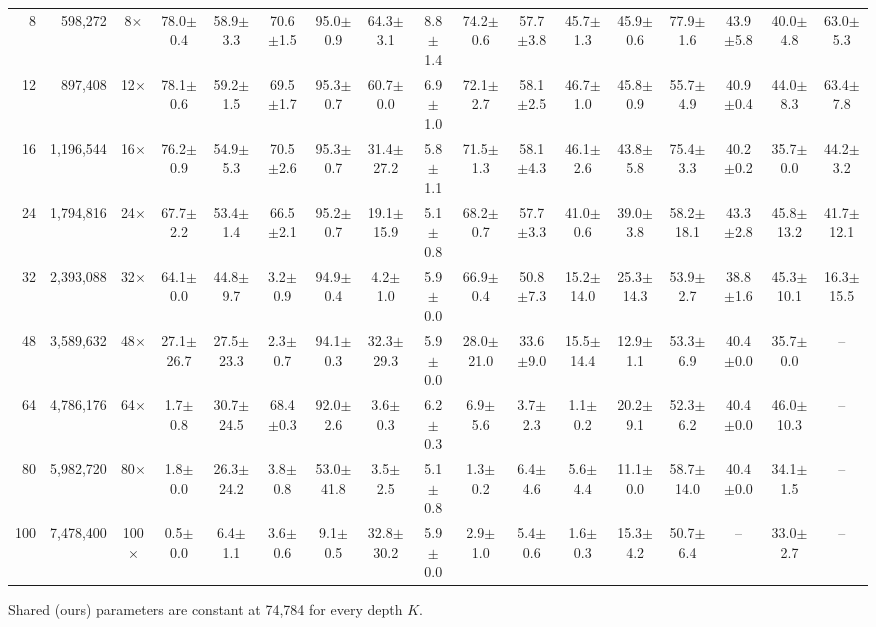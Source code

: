 \begin{table}[p]
{\begin{tabular}{rrccccccccccccccc}
8 & 598,272 & 8$\times$ & 78.0$\pm$0.4 & 58.9$\pm$3.3 & 70.6$\pm$1.5 & 95.0$\pm$0.9 & 64.3$\pm$3.1 & 8.8$\pm$1.4 & 74.2$\pm$0.6 & 57.7$\pm$3.8 & 45.7$\pm$1.3 & 45.9$\pm$0.6 & 77.9$\pm$1.6 & 43.9$\pm$5.8 & 40.0$\pm$4.8 & 63.0$\pm$5.3 \\
12 & 897,408 & 12$\times$ & 78.1$\pm$0.6 & 59.2$\pm$1.5 & 69.5$\pm$1.7 & 95.3$\pm$0.7 & 60.7$\pm$0.0 & 6.9$\pm$1.0 & 72.1$\pm$2.7 & 58.1$\pm$2.5 & 46.7$\pm$1.0 & 45.8$\pm$0.9 & 55.7$\pm$4.9 & 40.9$\pm$0.4 & 44.0$\pm$8.3 & 63.4$\pm$7.8 \\
16 & 1,196,544 & 16$\times$ & 76.2$\pm$0.9 & 54.9$\pm$5.3 & 70.5$\pm$2.6 & 95.3$\pm$0.7 & 31.4$\pm$27.2 & 5.8$\pm$1.1 & 71.5$\pm$1.3 & 58.1$\pm$4.3 & 46.1$\pm$2.6 & 43.8$\pm$5.8 & 75.4$\pm$3.3 & 40.2$\pm$0.2 & 35.7$\pm$0.0 & 44.2$\pm$3.2 \\
24 & 1,794,816 & 24$\times$ & 67.7$\pm$2.2 & 53.4$\pm$1.4 & 66.5$\pm$2.1 & 95.2$\pm$0.7 & 19.1$\pm$15.9 & 5.1$\pm$0.8 & 68.2$\pm$0.7 & 57.7$\pm$3.3 & 41.0$\pm$0.6 & 39.0$\pm$3.8 & 58.2$\pm$18.1 & 43.3$\pm$2.8 & 45.8$\pm$13.2 & 41.7$\pm$12.1 \\
32 & 2,393,088 & 32$\times$ & 64.1$\pm$0.0 & 44.8$\pm$9.7 & 3.2$\pm$0.9 & 94.9$\pm$0.4 & 4.2$\pm$1.0 & 5.9$\pm$0.0 & 66.9$\pm$0.4 & 50.8$\pm$7.3 & 15.2$\pm$14.0 & 25.3$\pm$14.3 & 53.9$\pm$2.7 & 38.8$\pm$1.6 & 45.3$\pm$10.1 & 16.3$\pm$15.5 \\
48 & 3,589,632 & 48$\times$ & 27.1$\pm$26.7 & 27.5$\pm$23.3 & 2.3$\pm$0.7 & 94.1$\pm$0.3 & 32.3$\pm$29.3 & 5.9$\pm$0.0 & 28.0$\pm$21.0 & 33.6$\pm$9.0 & 15.5$\pm$14.4 & 12.9$\pm$1.1 & 53.3$\pm$6.9 & 40.4$\pm$0.0 & 35.7$\pm$0.0 & -- \\
64 & 4,786,176 & 64$\times$ & 1.7$\pm$0.8 & 30.7$\pm$24.5 & 68.4$\pm$0.3 & 92.0$\pm$2.6 & 3.6$\pm$0.3 & 6.2$\pm$0.3 & 6.9$\pm$5.6 & 3.7$\pm$2.3 & 1.1$\pm$0.2 & 20.2$\pm$9.1 & 52.3$\pm$6.2 & 40.4$\pm$0.0 & 46.0$\pm$10.3 & -- \\
80 & 5,982,720 & 80$\times$ & 1.8$\pm$0.0 & 26.3$\pm$24.2 & 3.8$\pm$0.8 & 53.0$\pm$41.8 & 3.5$\pm$2.5 & 5.1$\pm$0.8 & 1.3$\pm$0.2 & 6.4$\pm$4.6 & 5.6$\pm$4.4 & 11.1$\pm$0.0 & 58.7$\pm$14.0 & 40.4$\pm$0.0 & 34.1$\pm$1.5 & -- \\
100 & 7,478,400 & 100$\times$ & 0.5$\pm$0.0 & 6.4$\pm$1.1 & 3.6$\pm$0.6 & 9.1$\pm$0.5 & 32.8$\pm$30.2 & 5.9$\pm$0.0 & 2.9$\pm$1.0 & 5.4$\pm$0.6 & 1.6$\pm$0.3 & 15.3$\pm$4.2 & 50.7$\pm$6.4 & -- & 33.0$\pm$2.7 & -- \\
\bottomrule
\end{tabular}}
\par\noindent\footnotesize Shared (ours) parameters are constant at 74,784 for every depth $K$.
\end{table}
